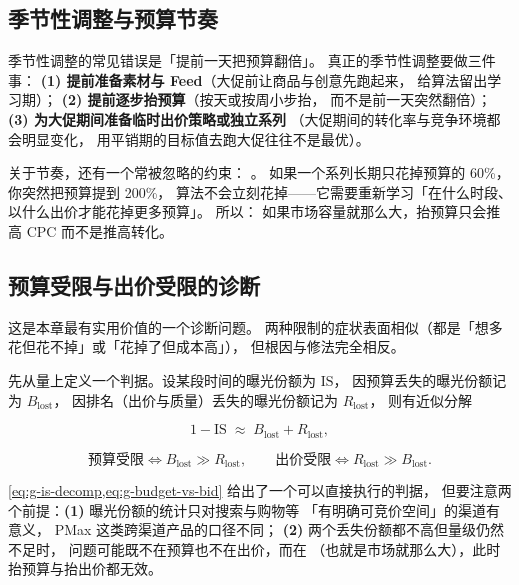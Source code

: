 \subsection{季节性调整与预算节奏}

季节性调整的常见错误是「提前一天把预算翻倍」。
真正的季节性调整要做三件事：
\textbf{(1) 提前准备素材与 Feed}（大促前让商品与创意先跑起来，
给算法留出学习期）；
\textbf{(2) 提前逐步抬预算}（按天或按周小步抬，
而不是前一天突然翻倍）；
\textbf{(3) 为大促期间准备临时出价策略或独立系列}
（大促期间的转化率与竞争环境都会明显变化，
用平销期的目标值去跑大促往往不是最优）。

关于节奏，还有一个常被忽略的约束：
。
如果一个系列长期只花掉预算的 60\%，
你突然把预算提到 200\%，
算法不会立刻花掉——它需要重新学习「在什么时段、
以什么出价才能花掉更多预算」。
所以：
如果市场容量就那么大，抬预算只会推高 CPC 而不是推高转化。

\subsection{预算受限与出价受限的诊断}

这是本章最有实用价值的一个诊断问题。
两种限制的症状表面相似（都是「想多花但花不掉」或「花掉了但成本高」），
但根因与修法完全相反。

先从量上定义一个判据。设某段时间的曝光份额为 $\mathrm{IS}$，
因预算丢失的曝光份额记为 $B_{\text{lost}}$，
因排名（出价与质量）丢失的曝光份额记为 $R_{\text{lost}}$，
则有近似分解

\begin{equation}
1 - \mathrm{IS} \;\approx\; B_{\text{lost}} + R_{\text{lost}} ,
\label{eq:g-is-decomp}
\end{equation}

\begin{equation}
\text{预算受限} \iff B_{\text{lost}} \gg R_{\text{lost}} ,
\qquad
\text{出价受限} \iff R_{\text{lost}} \gg B_{\text{lost}} .
\label{eq:g-budget-vs-bid}
\end{equation}

\cref{eq:g-is-decomp,eq:g-budget-vs-bid} 给出了一个可以直接执行的判据，
但要注意两个前提：\textbf{(1)} 曝光份额的统计只对搜索与购物等
「有明确可竞价空间」的渠道有意义，
PMax 这类跨渠道产品的口径不同；
\textbf{(2)} 两个丢失份额都不高但量级仍然不足时，
问题可能既不在预算也不在出价，而在
（也就是市场就那么大），此时抬预算与抬出价都无效。

